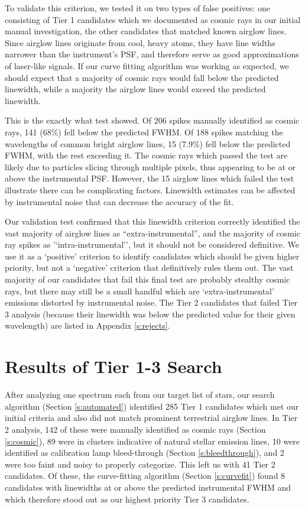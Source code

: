 \documentclass[twocolumn]{aastex701}
\begin{document}
To validate this criterion, we tested it on two types of false positives: one consisting of Tier 1 candidates which we documented as cosmic rays in our initial manual investigation, the other candidates that matched known airglow lines.  Since airglow lines originate from cool, heavy atoms, they have line widths narrower than the instrument's PSF, and therefore serve as good approximations of laser-like  signals.  If our curve fitting algorithm was working as expected, we should expect that a majority of cosmic rays would fall below the predicted linewidth, while a majority the airglow lines would exceed the predicted linewidth.

This is the exactly what test showed.  Of 206 spikes manually identified as cosmic rays, 141 (68\%) fell below the predicted FWHM.  Of 188 spikes matching the wavelengths of common bright airglow lines, 15 (7.9\%) fell below the predicted FWHM, with the rest exceeding it. The cosmic rays which passed the test are likely due to particles slicing through multiple pixels, thus appearing to be at or above the instrumental PSF. However, the 15 airglow lines which failed the test illustrate there can be complicating factors. Linewidth estimates can be affected by instrumental noise that can decrease the accuracy of the fit. 

Our validation test confirmed that this linewidth criterion correctly identified the vast majority of airglow lines as ``extra-instrumental'', and the majority of cosmic ray spikes as '`intra-instrumental'', but it should not be considered definitive.  We use it as a `positive' criterion to identify candidates which should be given higher priority, but not a `negative' criterion that definitively rules them out.  The vast majority of our candidates that fail this final test are probably stealthy cosmic rays, but there may still be a small handful which are `extra-instrumental' emissions distorted by instrumental noise. The Tier 2 candidates that failed Tier 3 analysis (because their linewidth was below the predicted value for their given wavelength) are listed in Appendix \ref{s:rejects}.

\section{Results of Tier 1-3 Search}
\label{s:results}
After analyzing one spectrum each from our target list of stars, our search algorithm (Section \ref{s:automated}) identified 285 Tier 1 candidates which met our initial criteria and also did not match prominent terrestrial airglow lines. In Tier 2 analysis, 142 of these were manually identified as cosmic rays (Section \ref{s:cosmic}), 89 were in clusters indicative of natural stellar emission lines,  10 were identified as calibration lamp bleed-through (Section \ref{s:bleedthrough}), and 2 were too faint and noisy to properly categorize. This left us with 41 Tier 2 candidates. Of these, the curve-fitting algorithm (Section \ref{s:curvefit}) found 8 candidates with linewidths at or above the predicted instrumental FWHM and which therefore stood out as our highest priority Tier 3 candidates. 
\end{document}

